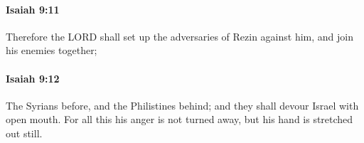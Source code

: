 		\paragraph{Isaiah 9:11} %
			\label{ISAIAH-9-11}

			Therefore the LORD shall set up the adversaries of Rezin against him, and join his enemies together;


		\paragraph{Isaiah 9:12} %
			\label{ISAIAH-9-12}

			The Syrians before, and the Philistines behind; and they shall devour Israel with open mouth. For all this his anger is not turned away, but his hand is stretched out still.


